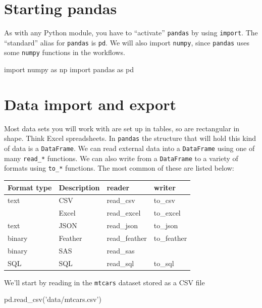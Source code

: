 \documentclass[
  letterpaper,
]{scrbook}
\newenvironment{Shaded}{\begin{snugshade}}{\end{snugshade}}
\newcommand{\ImportTok}[1]{#1}
\newcommand{\NormalTok}[1]{#1}
\newcommand{\StringTok}[1]{\textcolor[rgb]{0.31,0.60,0.02}{#1}}
\begin{document}
\hypertarget{starting-pandas}{%
\section{Starting pandas}\label{starting-pandas}}

As with any Python module, you have to ``activate'' \texttt{pandas} by using \texttt{import}. The ``standard'' alias for \texttt{pandas} is \texttt{pd}. We will also import \texttt{numpy}, since \texttt{pandas} uses some \texttt{numpy} functions in the workflows.

\begin{Shaded}
\begin{Highlighting}[]
\ImportTok{import}\NormalTok{ numpy }\ImportTok{as}\NormalTok{ np}
\ImportTok{import}\NormalTok{ pandas }\ImportTok{as}\NormalTok{ pd}
\end{Highlighting}
\end{Shaded}

\hypertarget{data-import-and-export}{%
\section{Data import and export}\label{data-import-and-export}}

Most data sets you will work with are set up in tables, so are rectangular in shape. Think Excel spreadsheets. In \texttt{pandas} the structure that will hold this kind of data is a \texttt{DataFrame}. We can read external data into a \texttt{DataFrame} using one of many \texttt{read\_*} functions. We can also write from a \texttt{DataFrame} to a variety of formats using \texttt{to\_*} functions. The most common of these are listed below:

\begin{longtable}[]{@{}llll@{}}
\toprule
Format type & Description & reader & writer\tabularnewline
\midrule
\endhead
text & CSV & read\_csv & to\_csv\tabularnewline
& Excel & read\_excel & to\_excel\tabularnewline
text & JSON & read\_json & to\_json\tabularnewline
binary & Feather & read\_feather & to\_feather\tabularnewline
binary & SAS & read\_sas &\tabularnewline
SQL & SQL & read\_sql & to\_sql\tabularnewline
\bottomrule
\end{longtable}

We'll start by reading in the \texttt{mtcars} dataset stored as a CSV file

\begin{Shaded}
\begin{Highlighting}[]
\NormalTok{pd.read_csv(}\StringTok{'data/mtcars.csv'}\NormalTok{)}
\end{Highlighting}
\end{Shaded}
\end{document}
